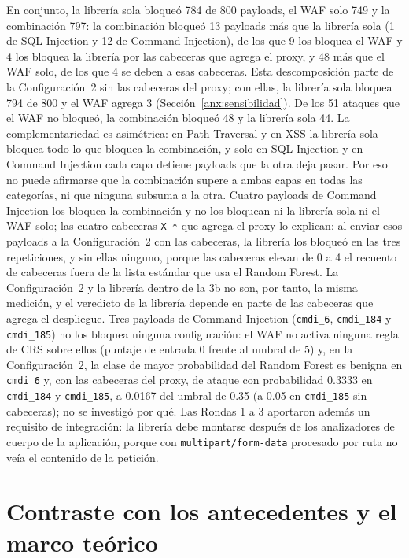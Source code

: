 En conjunto, la librería sola bloqueó 784 de 800 payloads, el WAF solo 749 y la combinación 797: la
combinación bloqueó 13 payloads más que la librería sola (1 de SQL Injection y 12 de Command
Injection), de los que 9 los bloquea el WAF y 4 los bloquea la librería por las cabeceras que agrega
el proxy, y 48 más que el WAF solo, de los que 4 se deben a esas cabeceras. Esta descomposición
parte de la Configuración~2 sin las cabeceras del proxy; con ellas, la librería sola bloquea 794 de
800 y el WAF agrega 3 (Sección~\ref{anx:sensibilidad}). De los 51 ataques que el WAF no bloqueó, la combinación bloqueó 48 y la librería sola 44. La
complementariedad es asimétrica: en Path Traversal y en XSS la librería sola bloquea todo lo que
bloquea la combinación, y solo en SQL Injection y en Command Injection cada capa detiene payloads
que la otra deja pasar. Por eso no puede afirmarse que la combinación supere a ambas capas en todas
las categorías, ni que ninguna subsuma a la otra. Cuatro payloads de Command Injection los bloquea
la combinación y no los bloquean ni la librería sola ni el WAF solo; las cuatro cabeceras
\texttt{X-*} que agrega el proxy lo explican: al enviar esos payloads a la Configuración~2 con las
cabeceras, la librería los bloqueó en las tres repeticiones, y sin ellas ninguno, porque las
cabeceras elevan de 0 a 4 el recuento de cabeceras fuera de la lista estándar que usa el Random
Forest. La Configuración~2 y la librería dentro de la 3b no son, por tanto, la misma medición, y el
veredicto de la librería depende en parte de las cabeceras que agrega el despliegue. Tres payloads
de Command Injection (\texttt{cmdi\_6}, \texttt{cmdi\_184} y \texttt{cmdi\_185}) no los bloquea
ninguna configuración: el WAF no activa ninguna regla de CRS sobre ellos (puntaje de entrada 0
frente al umbral de 5) y, en la Configuración~2, la clase de mayor probabilidad del Random Forest
es benigna en \texttt{cmdi\_6} y, con las cabeceras del proxy, de ataque con probabilidad 0.3333 en
\texttt{cmdi\_184} y \texttt{cmdi\_185}, a 0.0167 del umbral de 0.35 (a 0.05 en \texttt{cmdi\_185}
sin cabeceras); no se investigó por qué. Las Rondas 1 a 3 aportaron
además un requisito de integración: la librería debe montarse después de los analizadores de
cuerpo de la aplicación, porque con \texttt{multipart/form-data} procesado por ruta no veía el
contenido de la petición.

\section{Contraste con los antecedentes y el marco teórico}


